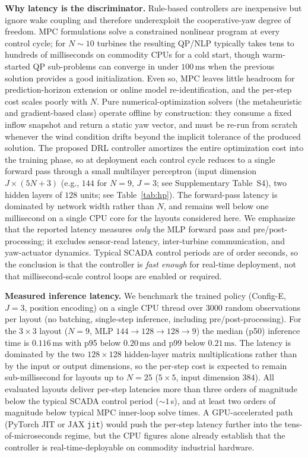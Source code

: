 \documentclass[final,5p,times]{elsarticle}
\begin{document}
\textbf{Why latency is the discriminator.} Rule-based controllers are inexpensive but ignore wake coupling and therefore underexploit the cooperative-yaw degree of freedom. MPC formulations \citep{Boersma2017,Andersson2021} solve a constrained nonlinear program at every control cycle; for $N\!\sim\!10$ turbines the resulting QP/NLP typically takes tens to hundreds of milliseconds on commodity CPUs for a cold start, though warm-started QP sub-problems can converge in under $100$\,ms when the previous solution provides a good initialization. Even so, MPC leaves little headroom for prediction-horizon extension or online model re-identification, and the per-step cost scales poorly with $N$. Pure numerical-optimization solvers (the metaheuristic and gradient-based class) operate offline by construction: they consume a fixed inflow snapshot and return a static yaw vector, and must be re-run from scratch whenever the wind condition drifts beyond the implicit tolerance of the produced solution. The proposed DRL controller amortizes the entire optimization cost into the training phase, so at deployment each control cycle reduces to a single forward pass through a small multilayer perceptron (input dimension $J{\times}(5N{+}3)$ (e.g., $144$ for $N{=}9$, $J{=}3$; see Supplementary Table~S4), two hidden layers of $128$ units; see Table~\ref{tab:hp}). The forward-pass latency is dominated by network width rather than $N$, and remains well below one millisecond on a single CPU core for the layouts considered here. We emphasize that the reported latency measures \emph{only} the MLP forward pass and pre/post-processing; it excludes sensor-read latency, inter-turbine communication, and yaw-actuator dynamics. Typical SCADA control periods are of order seconds, so the conclusion is that the controller is \emph{fast enough} for real-time deployment, not that millisecond-scale control loops are enabled or required.

\textbf{Measured inference latency.} We benchmark the trained policy (Config-E, $J{=}3$, position encoding) on a single CPU thread over $3000$ random observations per layout (no batching, single-step inference, including pre/post-processing). For the $3{\times}3$ layout ($N{=}9$, MLP $144{\to}128{\to}128{\to}9$) the median (p50) inference time is $0.116\,\mathrm{ms}$ with p95 below $0.20\,\mathrm{ms}$ and p99 below $0.21\,\mathrm{ms}$. The latency is dominated by the two $128{\times}128$ hidden-layer matrix multiplications rather than by the input or output dimensions, so the per-step cost is expected to remain sub-millisecond for layouts up to $N{=}25$ ($5{\times}5$, input dimension $384$). All evaluated layouts deliver per-step latencies more than three orders of magnitude below the typical SCADA control period (${\sim}1$\,s), and at least two orders of magnitude below typical MPC inner-loop solve times. A GPU-accelerated path (PyTorch JIT or JAX \texttt{jit}) would push the per-step latency further into the tens-of-microseconds regime, but the CPU figures alone already establish that the controller is real-time-deployable on commodity industrial hardware.
\end{document}
